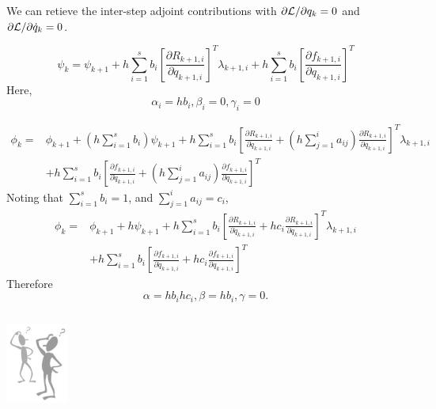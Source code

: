 \documentclass{beamer}
\newcommand{\pd}[2]{\frac{\partial #1}{\partial #2}}
\begin{document}
\begin{frame}[allowframebreaks]
  \framebreak
  
  \tiny{
    We can retieve the inter-step adjoint contributions with
    $\partial{{\cal L}}/\partial{{q}_k}=0$ and $\partial{{\cal L}}/\partial{\dot{q}_k}=0$.
    
    \begin{equation}\nonumber
      \psi_k = \psi_{k+1} + h \sum_{i=1}^s b_i \left[ \pd{R_{k+1,i}}{q_{k+1,i}} \right]^T \lambda_{k+1,i} + h \sum_{i=1}^s b_i \left[ \pd{f_{k+1,i}}{q_{k+1,i}} \right]^T
    \end{equation}
    Here, $$ \alpha_i = hb_i, \beta_i = 0, \gamma_i = 0$$

    \begin{equation}\nonumber
      \begin{split}
        \phi_k = & \phi_{k+1} + \left(h\sum_{i=1}^s b_i\right) \psi_{k+1}  + h \sum_{i=1}^sb_i \left[\pd{R_{k+1,i}}{\dot{q}_{k+1,i}} + \left( h \sum_{j=1}^i a_{ij} \right) \pd{R_{k+1,i}}{q_{k+1,i}} \right]^T \lambda_{k+1,i}  \\
        & + h \sum_{i=1}^sb_i \left[\pd{f_{k+1,i}}{\dot{q}_{k+1,i}} + \left( h \sum_{j=1}^i a_{ij} \right) \pd{f_{k+1,i}}{q_{k+1,i}} \right]^T
      \end{split}
    \end{equation}
    Noting that $\sum_{i=1}^s b_i = 1$, and $\sum_{j=1}^i a_{ij} = c_i$,
    \begin{equation}\nonumber
      \begin{split}
        \phi_k = & \phi_{k+1} + h \psi_{k+1}  + h \sum_{i=1}^sb_i \left[\pd{R_{k+1,i}}{\dot{q}_{k+1,i}} + hc_i \pd{R_{k+1,i}}{q_{k+1,i}} \right]^T \lambda_{k+1,i}  \\ &+ h \sum_{i=1}^sb_i \left[\pd{f_{k+1,i}}{\dot{q}_{k+1,i}} +hc_i \pd{f_{k+1,i}}{q_{k+1,i}} \right]^T
      \end{split}
    \end{equation}
    Therefore  $$\alpha = hb_ihc_i, \beta = hb_i, \gamma = 0.$$
  }
  
\end{frame}

\begin{frame}
  \begin{columns}
    \column{6cm}
    \begin{block}{}
      \centerline{ 
        \includegraphics[width=0.5\textwidth]{Question.png} 
      }
    \end{block}
  \end{columns}
\end{frame}
\end{document}
